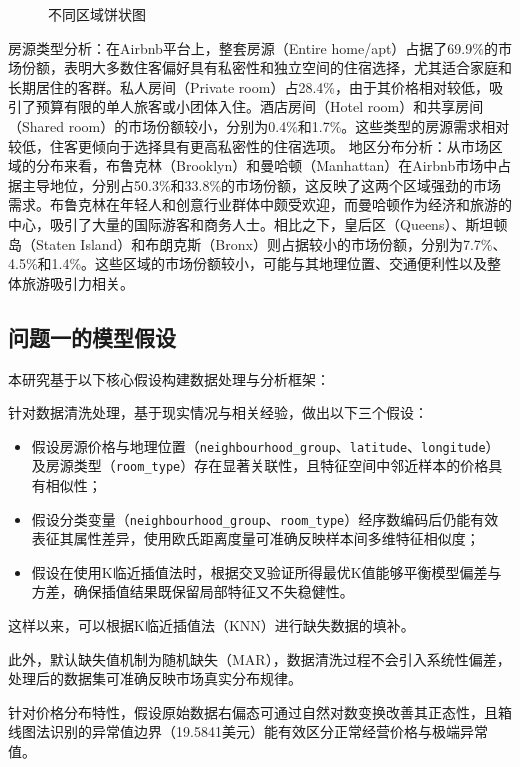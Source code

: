 \documentclass[12pt]{article}
\begin{document}
\begin{CJK}{UTF8}{gbsn}
\begin{figure}[H]
\begin{minipage}[b]{0.45\textwidth}
			\caption{不同区域饼状图}
		\end{minipage}
		
	\end{figure}
	
	房源类型分析：在Airbnb平台上，整套房源（Entire home/apt）占据了69.9\%的市场份额，表明大多数住客偏好具有私密性和独立空间的住宿选择，尤其适合家庭和长期居住的客群。私人房间（Private room）占28.4\%，由于其价格相对较低，吸引了预算有限的单人旅客或小团体入住。酒店房间（Hotel room）和共享房间（Shared room）的市场份额较小，分别为0.4\%和1.7\%。这些类型的房源需求相对较低，住客更倾向于选择具有更高私密性的住宿选项。
	地区分布分析：从市场区域的分布来看，布鲁克林（Brooklyn）和曼哈顿（Manhattan）在Airbnb市场中占据主导地位，分别占50.3\%和33.8\%的市场份额，这反映了这两个区域强劲的市场需求。布鲁克林在年轻人和创意行业群体中颇受欢迎，而曼哈顿作为经济和旅游的中心，吸引了大量的国际游客和商务人士。相比之下，皇后区（Queens）、斯坦顿岛（Staten Island）和布朗克斯（Bronx）则占据较小的市场份额，分别为7.7\%、4.5\%和1.4\%。这些区域的市场份额较小，可能与其地理位置、交通便利性以及整体旅游吸引力相关。
	
	\subsection{问题一的模型假设}
	本研究基于以下核心假设构建数据处理与分析框架：
	
	针对数据清洗处理，基于现实情况与相关经验，做出以下三个假设：
	
	\begin{itemize}
		\item 假设房源价格与地理位置（\texttt{neighbourhood\_group}、\texttt{latitude}、\texttt{longitude}）及房源类型（\texttt{room\_type}）存在显著关联性，且特征空间中邻近样本的价格具有相似性；
		\item 假设分类变量（\texttt{neighbourhood\_group}、\texttt{room\_type}）经序数编码后仍能有效表征其属性差异，使用欧氏距离度量可准确反映样本间多维特征相似度；
		\item 假设在使用K临近插值法时，根据交叉验证所得最优K值能够平衡模型偏差与方差，确保插值结果既保留局部特征又不失稳健性。
	\end{itemize}
	
	这样以来，可以根据K临近插值法（KNN）进行缺失数据的填补。
	
	此外，默认缺失值机制为随机缺失（MAR），数据清洗过程不会引入系统性偏差，处理后的数据集可准确反映市场真实分布规律。
	
	针对价格分布特性，假设原始数据右偏态可通过自然对数变换改善其正态性，且箱线图法识别的异常值边界（19.5841美元）能有效区分正常经营价格与极端异常值。
	

\end{CJK}
\end{document}
